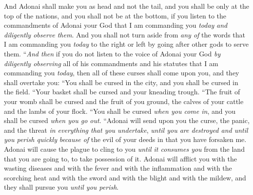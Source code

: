 \begin{biblechapter}
\verse And Adonai shall make you as head and not the tail, and you shall be only at the top of the nations, and you shall not be at the bottom, if you listen to the commandments of Adonai your God that I am commanding you \textit{today} \textit{and diligently observe them}.
\verse And you shall not turn aside from \textit{any of} the words that I am commanding you \textit{today} to the right or left by going after other gods to serve them.
\verse “\textit{And then} if you do not listen to the voice of Adonai your God \textit{by diligently observing} all of his commandments and his statutes that I am commanding you \textit{today}, then all of these curses shall come upon you, and they shall overtake you:
\verse “You shall be cursed in the city, and you shall be cursed in the field.
\verse “Your basket shall be cursed and your kneading trough.
\verse “The fruit of your womb shall be cursed and the fruit of you ground, the calves of your cattle and the lambs of your flock.
\verse “You shall be cursed \textit{when you come in}, and you shall be cursed \textit{when you go out}.
\verse “Adonai will send upon you the curse, the panic, and the threat \textit{in everything that you undertake}, \textit{until you are destroyed and until you perish quickly} \textit{because of} the evil of your deeds in that you have forsaken me.
\verse Adonai will cause the plague to cling to you \textit{until it consumes you} from the land that you are going to, to take possession of it.
\verse Adonai will afflict you with the wasting diseases and with the fever and with the inflammation and with the scorching heat and with the sword and with the blight and with the mildew, and they shall pursue you \textit{until you perish}.

\end{biblechapter}
